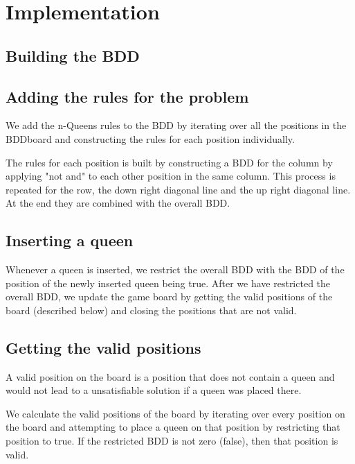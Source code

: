 \section{Implementation}
\label{Implementation}


\subsection{Building the BDD}

\subsection{Adding the rules for the problem}
We add the n-Queens rules to the BDD by iterating over all the positions in the BDDboard and constructing the rules for each position individually.

The rules for each position is built by constructing a BDD for the column by applying "not and" to each other position in the same column. This process is repeated for the row, the down right diagonal line and the up right diagonal line. At the end they are combined with the overall BDD.

\subsection{Inserting a queen}
Whenever a queen is inserted, we restrict the overall BDD with the BDD of the position of the newly inserted queen being true. After we have restricted the overall BDD, we update the game board by getting the valid positions of the board (described below) and closing the positions that are not valid.

\subsection{Getting the valid positions}
A valid position on the board is a position that does not contain a queen and would not lead to a unsatisfiable solution if a queen was placed there.

We calculate the valid positions of the board by iterating over every position on the board and attempting to place a queen on that position by restricting that position to true. If the restricted BDD is not zero (false), then that position is valid.